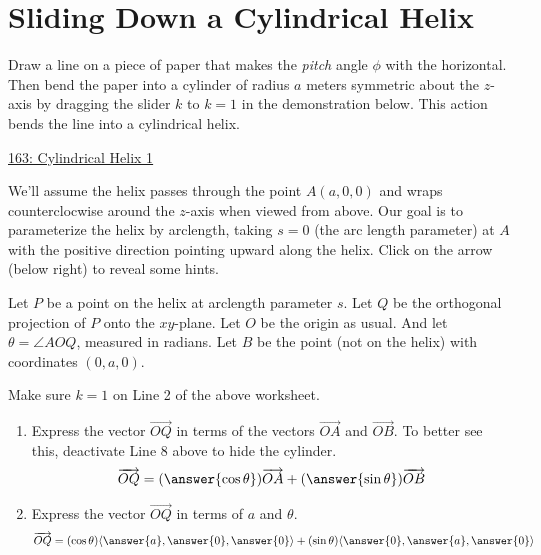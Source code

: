 \documentclass{ximera}
\begin{document}
\section{Sliding Down a Cylindrical Helix}
\begin{question}  \label{Qdef54356452}
Draw a line on a piece of paper that makes the \emph{pitch} angle $\phi$ with the horizontal. Then bend the paper into a cylinder of radius $a$ meters symmetric about the $z$-axis by dragging the slider $k$ to $k=1$ in the demonstration below. This action bends the line into a cylindrical helix.

\begin{onlineOnly}
    \begin{center}
\end{center}
\end{onlineOnly}

\href{https://www.desmos.com/3d/vrrpxfddv2}{163: Cylindrical Helix 1}

We'll assume the helix passes through the point $A(a,0,0)$ and wraps counterclocwise around the $z$-axis when viewed from above. Our goal is to parameterize the helix by arclength, taking $s=0$ (the arc length parameter) at $A$ with the positive direction pointing upward along the helix. Click on the arrow (below right) to reveal some hints.

\begin{expandable}
Let $P$ be a point on the helix at arclength parameter $s$. Let $Q$ be the orthogonal projection of $P$ onto the $xy$-plane.
Let $O$ be the origin as usual. And let $\theta = \angle AOQ$, measured in radians.
Let $B$ be the point (not on the helix) with coordinates $(0,a,0)$.

Make sure $k=1$ on Line 2 of the above worksheet.

\begin{enumerate}
\item Express the vector $\overrightarrow{OQ}$ in terms of the vectors $\overrightarrow{OA}$ and $\overrightarrow{OB}$. To better see this, deactivate Line 8 above to hide the cylinder.
\[
   \overrightarrow{OQ} = (\answer{\cos\theta})\overrightarrow{OA} + (\answer{\sin\theta})\overrightarrow{OB}
\]

\item Express the vector $\overrightarrow{OQ}$ in terms of $a$ and $\theta$. %
\[
    \overrightarrow{OQ} = (\cos\theta)\langle \answer{a},\answer{0},\answer{0} \rangle + (\sin\theta)\langle \answer{0},\answer{a},\answer{0} \rangle
\]



\end{enumerate}
\end{expandable}
\end{question}
\end{document}

